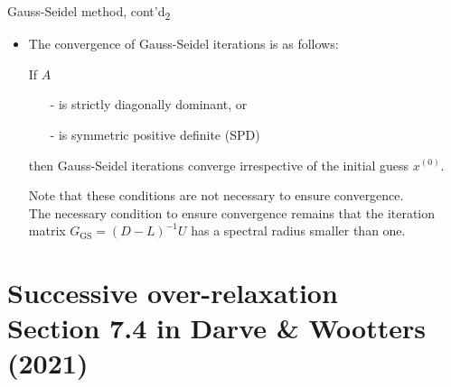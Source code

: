 \documentclass[t,usepdftitle=false]{beamer}
\begin{document}
\begin{frame}{Gauss-Seidel method, cont'd\textsubscript{2}}
\begin{itemize}
\item The convergence of Gauss-Seidel iterations is as follows:
\begin{theorem}
If $A$
\begin{itemize}
\item[-] is strictly diagonally dominant, or 
\item[-] is symmetric positive definite (SPD)
\end{itemize}
then Gauss-Seidel iterations converge irrespective of the initial guess $x^{(0)}$.
\end{theorem}
Note that these conditions are not necessary to ensure convergence.\vspace{.1cm}\\
The necessary condition to ensure convergence remains that the iteration matrix $G_{\mathrm{GS}}=(D-L)^{-1}U$ has a spectral radius smaller than one.
\end{itemize}
\end{frame}


\section{Successive over-relaxation\\{\small Section 7.4 in Darve \& Wootters (2021)}}
\end{document}
